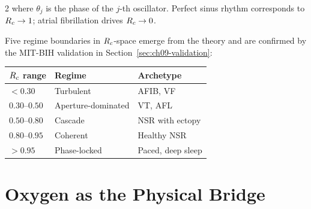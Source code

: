 \begin{multicols}{2}
where $\theta_j$ is the phase of the $j$-th oscillator.
Perfect sinus rhythm corresponds to $R_c \to 1$; atrial fibrillation
drives $R_c \to 0$.

Five regime boundaries in $R_c$-space emerge from the theory and are
confirmed by the MIT-BIH validation in Section~\ref{sec:ch09-validation}:

\begin{center}
\begin{tabular}{lll}
\toprule
$R_c$ range & Regime & Archetype \\
\midrule
$< 0.30$ & Turbulent & AFIB, VF \\
$0.30$--$0.50$ & Aperture-dominated & VT, AFL \\
$0.50$--$0.80$ & Cascade & NSR with ectopy \\
$0.80$--$0.95$ & Coherent & Healthy NSR \\
$> 0.95$ & Phase-locked & Paced, deep sleep \\
\bottomrule
\end{tabular}
\end{center}

\end{multicols}

\section{Oxygen as the Physical Bridge}
\label{sec:ch09-oxygen}

